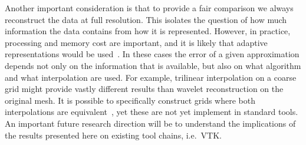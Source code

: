 Another important consideration is that to provide a fair comparison we always reconstruct the data
at full resolution. This isolates the question of how much information the data contains from how it
is represented. However, in practice, processing and memory cost are important, and it is likely
that adaptive representations would be used~\cite{gigavoxels,Gobbetti2008,vdb2013}. In these cases
the error of a given approximation depends not only on the information that is available, but also
on what algorithm and what interpolation are used. For example, trilinear interpolation on a coarse
grid might provide vastly different results than wavelet reconstruction on the original mesh. It is
possible to specifically construct grids where both interpolations are equivalent~\cite{weiss}, yet
these are not yet implement in standard tools. An important future research direction will be to
understand the implications of the results presented here on existing tool chains, i.e.\ VTK.

